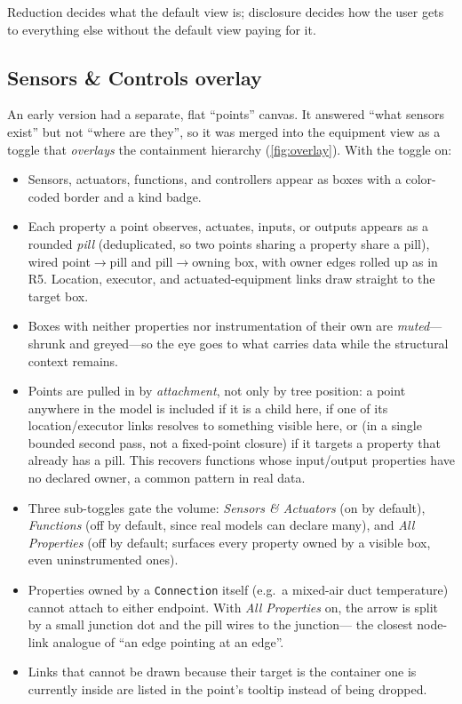 \documentclass[10pt,twocolumn]{article}
\newcommand{\pred}[1]{\texttt{#1}}   %
\begin{document}
Reduction decides what the default view is; disclosure decides how the user gets
to everything else without the default view paying for it.

\subsection{Sensors \& Controls overlay}
\label{sec:overlay}
An early version had a separate, flat ``points'' canvas. It answered ``what
sensors exist'' but not ``where are they'', so it was merged into the equipment
view as a toggle that \emph{overlays} the containment hierarchy
(\cref{fig:overlay}). With the toggle on:

\begin{itemize}[leftmargin=*,itemsep=1pt]
  \item Sensors, actuators, functions, and controllers appear as boxes with a
  color-coded border and a kind badge.
  \item Each property a point observes, actuates, inputs, or outputs appears as a
  rounded \emph{pill} (deduplicated, so two points sharing a property share a
  pill), wired point$\to$pill and pill$\to$owning box, with owner edges rolled up
  as in R5. Location, executor, and actuated-equipment links draw straight to the
  target box.
  \item Boxes with neither properties nor instrumentation of their own are
  \emph{muted}---shrunk and greyed---so the eye goes to what carries data while
  the structural context remains.
  \item Points are pulled in by \emph{attachment}, not only by tree position: a
  point anywhere in the model is included if it is a child here, if one of its
  location/executor links resolves to something visible here, or (in a single
  bounded second pass, not a fixed-point closure) if it targets a property that
  already has a pill. This recovers functions whose input/output properties have
  no declared owner, a common pattern in real data.
  \item Three sub-toggles gate the volume: \emph{Sensors \& Actuators} (on by
  default), \emph{Functions} (off by default, since real models can declare many),
  and \emph{All Properties} (off by default; surfaces every property owned by a
  visible box, even uninstrumented ones).
  \item Properties owned by a \pred{Connection} itself (e.g.\ a mixed-air duct
  temperature) cannot attach to either endpoint. With \emph{All Properties} on,
  the arrow is split by a small junction dot and the pill wires to the junction---
  the closest node-link analogue of ``an edge pointing at an edge''.
  \item Links that cannot be drawn because their target is the container one is
  currently inside are listed in the point's tooltip instead of being dropped.
\end{itemize}
\end{document}
